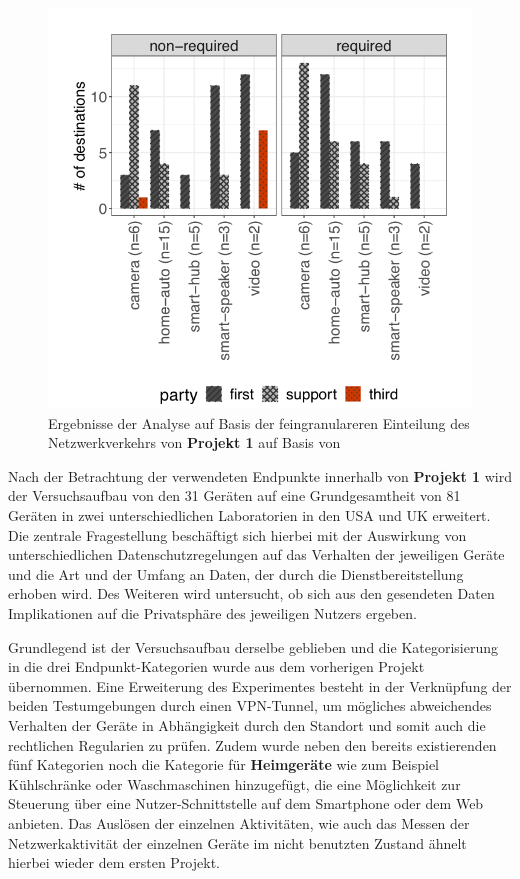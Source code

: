 \begin{figure}
    \centering
    \includegraphics[scale=0.3]{main/pictures/projekt_one/Non_Required_Destination_Per_Party}
    \caption{Ergebnisse der Analyse auf Basis der feingranulareren Einteilung des Netzwerkverkehrs von \textbf{Projekt 1} auf Basis von \cite{Mandalari2021}}
    \label{fig:result-non-req-dest-per-party}
\end{figure}

\noindent Nach der Betrachtung der verwendeten Endpunkte innerhalb von \textbf{Projekt 1} wird der Versuchsaufbau von den 31 Geräten auf eine Grundgesamtheit von 81 Geräten in zwei unterschiedlichen Laboratorien in den USA und UK erweitert. 
Die zentrale Fragestellung beschäftigt sich hierbei mit der Auswirkung von unterschiedlichen Datenschutzregelungen auf das Verhalten der jeweiligen Geräte und die Art und der Umfang an Daten, der durch die Dienstbereitstellung erhoben wird. Des Weiteren wird untersucht, ob sich aus den gesendeten Daten Implikationen auf die Privatsphäre des jeweiligen Nutzers ergeben.

\noindent Grundlegend ist der Versuchsaufbau derselbe geblieben und die Kategorisierung in die drei Endpunkt-Kategorien wurde aus dem vorherigen Projekt übernommen. Eine Erweiterung des Experimentes besteht in der Verknüpfung der beiden Testumgebungen durch einen VPN-Tunnel, um mögliches abweichendes Verhalten der Geräte in Abhängigkeit durch den Standort und somit auch die rechtlichen Regularien zu prüfen. 
Zudem wurde neben den bereits existierenden fünf Kategorien noch die Kategorie für \textbf{Heimgeräte} wie zum Beispiel Kühlschränke oder Waschmaschinen hinzugefügt, die eine Möglichkeit zur Steuerung über eine Nutzer-Schnittstelle auf dem Smartphone oder dem Web anbieten. 
Das Auslösen der einzelnen Aktivitäten, wie auch das Messen der Netzwerkaktivität der einzelnen Geräte im nicht benutzten Zustand ähnelt hierbei wieder dem ersten Projekt.

